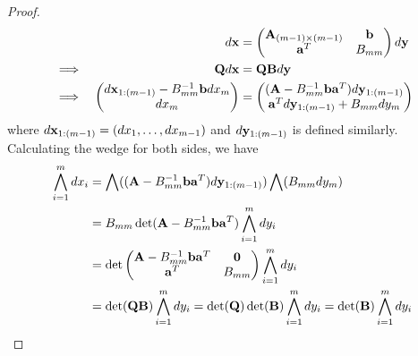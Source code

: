 \documentclass[11pt]{article}
\def\A{{\bf A}}
\def\a{{\bf a}}
\def\B{{\bf B}}
\def\b{{\bf b}}
\def\Q{{\bf Q}}
\def\x{{\bf x}}
\def\y{{\bf y}}
\begin{document}
\begin{proof}
	\begin{alignat*}{3}
		 &		& d\x 		&= 	\begin{pmatrix}
									\A_{(m-1)\times (m-1)} & \b\\
									\a^T 				 & B_{mm}\\
								\end{pmatrix} d\y \\
		&\implies	& \Q d\x 		&= \Q \B d\y			\\
		&\implies	& \begin{pmatrix} 
					d\x_{1:(m-1)} - B_{mm}^{-1}\b dx_m\\
					dx_m\\
				   \end{pmatrix}
							&= \begin{pmatrix}
								(\A-B_{mm}^{-1}\b\a^T)d\y_{1:(m-1)} \\
								\a^T d\y_{1:(m-1)}+B_{mm}dy_m\\
							     \end{pmatrix}
	\end{alignat*}
	where $d\x_{1:(m-1)} = (dx_1,\dots,dx_{m-1})$ and  $d\y_{1:(m-1)}$ is defined similarly.
	Calculating the wedge for both sides, we have
	\begin{align*}
		\bigwedge_{i=1}^m dx_i &= \bigwedge((\A-B_{mm}^{-1}\b\a^T)d\y_{1:(m-1)}) \bigwedge (B_{mm} dy_m)\\
		&= B_{mm} \det(\A-B_{mm}^{-1}\b\a^T) \bigwedge_{i=1}^m dy_i\\
		&= \det \begin{pmatrix}
				\A-B_{mm}^{-1}\b\a^T & \bf{0} \\
				\a^T  			& B_{mm}\\
			\end{pmatrix} \bigwedge_{i=1}^m dy_i\\
		&= \det(\Q\B) \bigwedge_{i=1}^m dy_i = \det(\Q)\det(\B)\bigwedge_{i=1}^m dy_i = \det(\B)\bigwedge_{i=1}^m dy_i\\
	\end{align*}
\end{proof}
\end{document}
